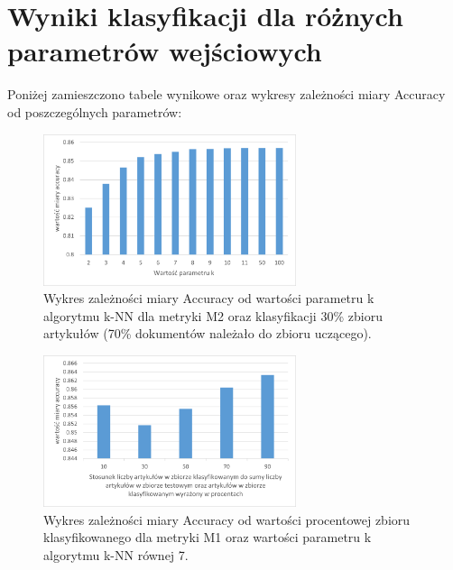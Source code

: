 \documentclass{classrep}
\begin{document}
\section{Wyniki klasyfikacji dla różnych parametrów wejściowych}




Poniżej zamieszczono tabele wynikowe oraz wykresy zależności miary Accuracy od poszczególnych parametrów:

\begin{figure}[H]
\centering
\includegraphics[width=0.66\textwidth]{wykres5.png}
\caption{Wykres zależności miary Accuracy od wartości parametru k algorytmu k-NN dla metryki M2 oraz klasyfikacji 30\% zbioru artykułów (70\% dokumentów należało do zbioru uczącego).}
\end{figure}

\begin{figure}[H]
\centering
\includegraphics[width=0.66\textwidth]{wykres6.png}
\caption{Wykres zależności miary Accuracy od wartości procentowej zbioru klasyfikowanego dla metryki M1 oraz wartości parametru k algorytmu k-NN równej 7.}
\end{figure}
\end{document}
